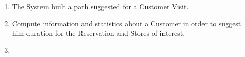 \documentclass[a4paper, 12pt, oneside]{article}
\begin{document}
\begin{itemize}
\begin{enumerate}[label={S.S.\arabic{*}}, align=left]
        
        \item \label{shared:buildPath} The System built a path suggested for a Customer Visit.
        \item \label{shared:9} Compute information and statistics about a Customer in order to suggest him duration for the Reservation and Stores of interest.
        
        
        
        
        \item
    \end{enumerate}
\end{itemize}

\end{document}
